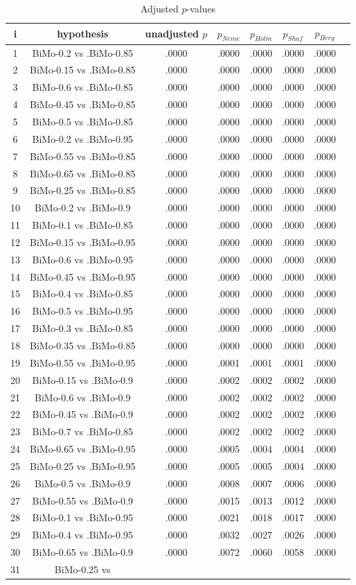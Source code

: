 \documentclass[a4paper,10pt]{article}
\begin{document}
\begin{landscape}
\begin{table}[!htp]
\centering\tiny
\caption{Adjusted $p$-values}
\begin{tabular}{cccccccc}
i&hypothesis&unadjusted $p$&$p_{Neme}$&$p_{Holm}$&$p_{Shaf}$&$p_{Berg}$\\
\hline
1&BiMo-0.2 vs .BiMo-0.85&.0000&.0000&.0000&.0000&.0000\\2&BiMo-0.15 vs .BiMo-0.85&.0000&.0000&.0000&.0000&.0000\\3&BiMo-0.6 vs .BiMo-0.85&.0000&.0000&.0000&.0000&.0000\\4&BiMo-0.45 vs .BiMo-0.85&.0000&.0000&.0000&.0000&.0000\\5&BiMo-0.5 vs .BiMo-0.85&.0000&.0000&.0000&.0000&.0000\\6&BiMo-0.2 vs .BiMo-0.95&.0000&.0000&.0000&.0000&.0000\\7&BiMo-0.55 vs .BiMo-0.85&.0000&.0000&.0000&.0000&.0000\\8&BiMo-0.65 vs .BiMo-0.85&.0000&.0000&.0000&.0000&.0000\\9&BiMo-0.25 vs .BiMo-0.85&.0000&.0000&.0000&.0000&.0000\\10&BiMo-0.2 vs .BiMo-0.9&.0000&.0000&.0000&.0000&.0000\\11&BiMo-0.1 vs .BiMo-0.85&.0000&.0000&.0000&.0000&.0000\\12&BiMo-0.15 vs .BiMo-0.95&.0000&.0000&.0000&.0000&.0000\\13&BiMo-0.6 vs .BiMo-0.95&.0000&.0000&.0000&.0000&.0000\\14&BiMo-0.45 vs .BiMo-0.95&.0000&.0000&.0000&.0000&.0000\\15&BiMo-0.4 vs .BiMo-0.85&.0000&.0000&.0000&.0000&.0000\\16&BiMo-0.5 vs .BiMo-0.95&.0000&.0000&.0000&.0000&.0000\\17&BiMo-0.3 vs .BiMo-0.85&.0000&.0000&.0000&.0000&.0000\\18&BiMo-0.35 vs .BiMo-0.85&.0000&.0000&.0000&.0000&.0000\\19&BiMo-0.55 vs .BiMo-0.95&.0000&.0001&.0001&.0001&.0000\\20&BiMo-0.15 vs .BiMo-0.9&.0000&.0002&.0002&.0002&.0000\\21&BiMo-0.6 vs .BiMo-0.9&.0000&.0002&.0002&.0002&.0000\\22&BiMo-0.45 vs .BiMo-0.9&.0000&.0002&.0002&.0002&.0000\\23&BiMo-0.7 vs .BiMo-0.85&.0000&.0002&.0002&.0002&.0000\\24&BiMo-0.65 vs .BiMo-0.95&.0000&.0005&.0004&.0004&.0000\\25&BiMo-0.25 vs .BiMo-0.95&.0000&.0005&.0005&.0004&.0000\\26&BiMo-0.5 vs .BiMo-0.9&.0000&.0008&.0007&.0006&.0000\\27&BiMo-0.55 vs .BiMo-0.9&.0000&.0015&.0013&.0012&.0000\\28&BiMo-0.1 vs .BiMo-0.95&.0000&.0021&.0018&.0017&.0000\\29&BiMo-0.4 vs .BiMo-0.95&.0000&.0032&.0027&.0026&.0000\\30&BiMo-0.65 vs .BiMo-0.9&.0000&.0072&.0060&.0058&.0000\\31&BiMo-0.25 vs 
\end{tabular}
\end{table}
\end{landscape}
\end{document}
